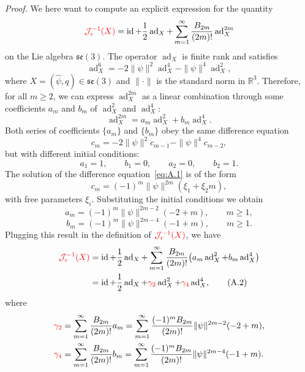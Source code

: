 \documentclass[11pt]{article}
\newcommand{\rev}[1]{\textcolor{red}{#1}}
\newcommand{\JopR}{\mathcal J_r}
\newcommand{\se}{\mathfrak{se}}
\newcommand{\ad}{\operatorname{ad}}
\newcommand{\id}{\operatorname{id}}
\newcommand{\R}{\mathbb R}
\begin{document}
\noindent\textit{Proof.} We here want to compute an explicit expression for the quantity
\begin{equation*}
\rev{\JopR^{-1}(X)}=\id+\frac12\ad_X+\sum_{m=1}^{\infty}\frac{B_{2m}}{(2m)!}\ad_X^{2m}
\end{equation*}
on the Lie algebra $\se(3)$. The operator $\ad_X$ is finite rank and satisfies
\begin{equation*}
\ad_X^6=-2\|\psi\|^2\ad_X^4-\|\psi\|^4\ad_X^2,
\end{equation*}
where $X=(\widehat\psi,q)\in\se(3)$ and $\|\cdot\|$ is the standard norm in $\R^3$. Therefore, for all $m\geq2$, we can express $\ad_X^{2m}$ as a linear combination through some coefficients $a_m$ and $b_m$ of $\ad_X^2$ and $\ad_X^4$:
\begin{equation*}
\ad_X^{2m}=a_m\ad_X^2+b_m\ad_X^4.
\end{equation*}
Both series of coefficients $\{a_m\}$ and $\{b_m\}$ obey the same difference equation
\begin{equation*}
c_m=-2\|\psi\|^2c_{m-1}-\|\psi\|^4c_{m-2},\tag{A.1}\label{eq:A.1}
\end{equation*}
but with different initial conditions:
\begin{equation*}
a_1=1,\qquad b_1=0,\qquad a_2=0,\qquad b_2=1.
\end{equation*}
The solution of the difference equation~\eqref{eq:A.1} is of the form
\begin{equation*}
c_m=(-1)^m\|\psi\|^{2m}(\xi_1+\xi_2m),
\end{equation*}
with free parameters $\xi_i$. Substituting the initial conditions we obtain
\begin{equation*}
a_m=(-1)^m\|\psi\|^{2m-2}(-2+m),\qquad m\geq1,
\end{equation*}
\begin{equation*}
b_m=(-1)^m\|\psi\|^{2m-4}(-1+m),\qquad m\geq1.
\end{equation*}
Plugging this result in the definition of $\rev{\JopR^{-1}(X)}$, we have
\begin{align*}
\rev{\JopR^{-1}(X)}
&=\id+\frac12\ad_X+\sum_{m=1}^{\infty}\frac{B_{2m}}{(2m)!}\bigl(a_m\ad_X^2+b_m\ad_X^4\bigr)\\
&=\id+\frac12\ad_X+\rev{\gamma_2}\ad_X^2+\rev{\gamma_4}\ad_X^4,\tag{A.2}\label{eq:A.2}
\end{align*}
where
\begin{align*}
\rev{\gamma_2}&=\sum_{m=1}^{\infty}\frac{B_{2m}}{(2m)!}a_m
=\sum_{m=1}^{\infty}\frac{(-1)^mB_{2m}}{(2m)!}\|\psi\|^{2m-2}(-2+m),\\
\rev{\gamma_4}&=\sum_{m=1}^{\infty}\frac{B_{2m}}{(2m)!}b_m
=\sum_{m=1}^{\infty}\frac{(-1)^mB_{2m}}{(2m)!}\|\psi\|^{2m-4}(-1+m).
\end{align*}
\end{document}
